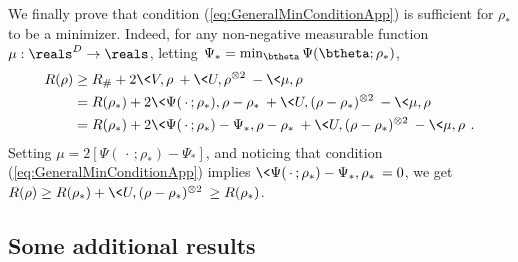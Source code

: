 \documentclass[11pt]{article}
\begin{document}
We finally prove that condition (\ref{eq:GeneralMinConditionApp}) is sufficient for $\rho_*$ to be a minimizer.
Indeed, for any non-negative  measurable function $\mu:\reals^D\to \reals$, letting $\Psi_*=\min_{\btheta}\Psi(\btheta;\rho_*)$,
%
\begin{align}
%
R(\rho) &\ge R_{\#} +2\<V,\rho\>+\<U,\rho^{\otimes 2}\> - \<\mu,\rho\>\\
& = R(\rho_*) +2\<\Psi(\,\cdot\,;\rho_*),\rho-\rho_*\>+\<U,(\rho-\rho_*)^{\otimes 2}\>-\<\mu,\rho\>\\
& = R(\rho_*) +2\<\Psi(\,\cdot\,;\rho_*)-\Psi_*,\rho-\rho_*\>+\<U,(\rho-\rho_*)^{\otimes 2}\>-\<\mu,\rho\>\, .
%
\end{align}
%
Setting $\mu= 2[\Psi(\,\cdot\,;\rho_*)-\Psi_*]$, and noticing that  condition (\ref{eq:GeneralMinConditionApp})  implies
$\<\Psi(\,\cdot\,;\rho_*)-\Psi_*,\rho_*\>=0$, we get $R(\rho) \ge R(\rho_*) +\<U,(\rho-\rho_*)^{\otimes 2}\>\ge R(\rho_*)$.


\subsection{Some additional results}
\end{document}
